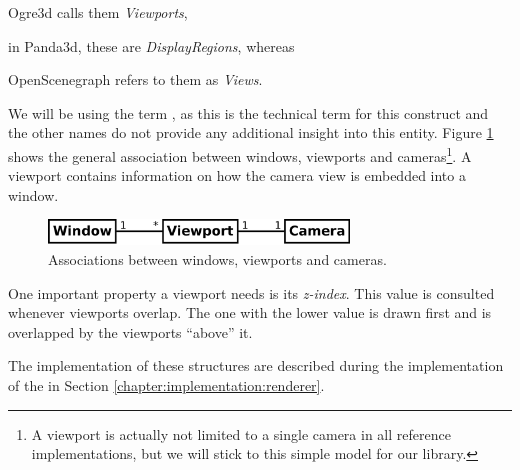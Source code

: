 	\begin{smalllist}
		\item Ogre3d calls them \emph{Viewports},
		\item in Panda3d, these are \emph{DisplayRegions}, whereas
		\item OpenScenegraph refers to them as \emph{Views}.
	\end{smalllist}
	
	We will be using the term , as this is the technical term for this construct and the other names do not provide any additional insight into this entity. Figure \ref{fig:WindowCameraAssociation} shows the general association between windows, viewports and cameras\footnote{A viewport is actually not limited to a single camera in all reference implementations, but we will stick to this simple model for our library.}. A viewport contains information on how the camera view is embedded into a window.

	\begin{figure}[htbp]
		\centering
		\includegraphics[width=8cm]{images/OgreWindowViewport.png}
		\caption{Associations between windows, viewports and cameras.}
		\label{fig:WindowCameraAssociation}
	\end{figure}

	One important property a viewport needs is its \emph{z-index}. This value is consulted whenever viewports overlap. The one with the lower value is drawn first and is overlapped by the viewports ``above'' it.

	The implementation of these structures are described during the implementation of the  in Section \ref{chapter:implementation:renderer}.

